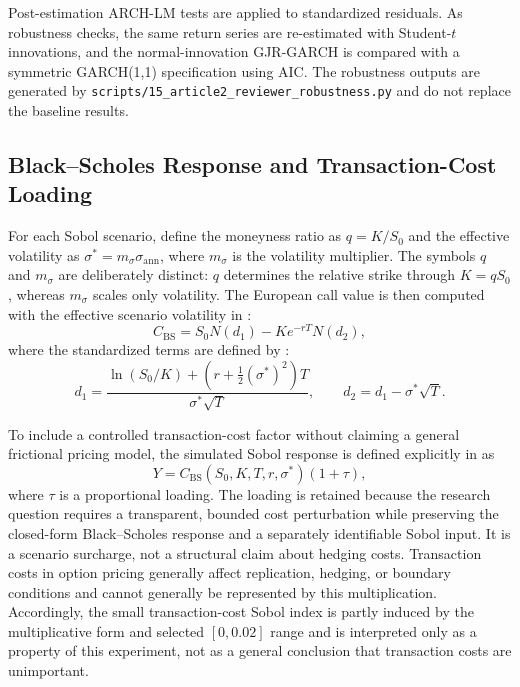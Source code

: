 Post-estimation ARCH-LM tests are applied to standardized residuals. As robustness checks, the same return series are re-estimated with Student-$t$ innovations, and the normal-innovation GJR-GARCH is compared with a symmetric GARCH(1,1) specification using AIC. The robustness outputs are generated by \texttt{scripts/15\_article2\_reviewer\_robustness.py} and do not replace the baseline results.

\subsection{Black--Scholes Response and Transaction-Cost Loading}
\label{subsec:response-function}

For each Sobol scenario, define the moneyness ratio as $q=K/S_0$ and the effective volatility as $\sigma^*=m_\sigma\sigma_{\mathrm{ann}}$, where $m_\sigma$ is the volatility multiplier. The symbols $q$ and $m_\sigma$ are deliberately distinct: $q$ determines the relative strike through $K=qS_0$, whereas $m_\sigma$ scales only volatility. The European call value is then computed with the effective scenario volatility in :
\begin{equation}
  C_{\mathrm{BS}}=S_0N(d_1)-Ke^{-rT}N(d_2),
  \label{eq:black-scholes-call}
\end{equation}
where the standardized terms are defined by :
\begin{equation}
  d_1=\frac{\ln(S_0/K)+(r+\tfrac12(\sigma^*)^2)T}
  {\sigma^*\sqrt{T}},\qquad
  d_2=d_1-\sigma^*\sqrt{T}.
  \label{eq:d1-d2}
\end{equation}

To include a controlled transaction-cost factor without claiming a general frictional pricing model, the simulated Sobol response is defined explicitly in  as
\begin{equation}
  Y=C_{\mathrm{BS}}(S_0,K,T,r,\sigma^*)(1+\tau),
  \label{eq:response-function}
\end{equation}
where $\tau$ is a proportional loading. The loading is retained because the research question requires a transparent, bounded cost perturbation while preserving the closed-form Black--Scholes response and a separately identifiable Sobol input. It is a scenario surcharge, not a structural claim about hedging costs. Transaction costs in option pricing generally affect replication, hedging, or boundary conditions and cannot generally be represented by this multiplication. Accordingly, the small transaction-cost Sobol index is partly induced by the multiplicative form and selected $[0,0.02]$ range and is interpreted only as a property of this experiment, not as a general conclusion that transaction costs are unimportant.

